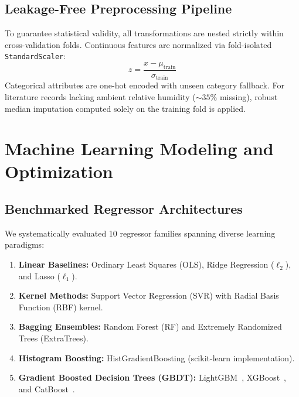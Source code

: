 \documentclass[10pt,twocolumn,a4paper]{article}
\begin{document}
\subsection{Leakage-Free Preprocessing Pipeline}
To guarantee statistical validity, all transformations are nested strictly within cross-validation folds. Continuous features are normalized via fold-isolated \texttt{StandardScaler}:
\begin{equation}
    z = \frac{x - \mu_{\text{train}}}{\sigma_{\text{train}}}
\end{equation}
Categorical attributes are one-hot encoded with unseen category fallback. For literature records lacking ambient relative humidity ($\sim 35\%$ missing), robust median imputation computed solely on the training fold is applied.

\section{Machine Learning Modeling and Optimization}
\label{sec:modeling}

\subsection{Benchmarked Regressor Architectures}
We systematically evaluated 10 regressor families spanning diverse learning paradigms:
\begin{enumerate}
    \item \textbf{Linear Baselines:} Ordinary Least Squares (OLS), Ridge Regression ($\ell_2$), and Lasso ($\ell_1$).
    \item \textbf{Kernel Methods:} Support Vector Regression (SVR) with Radial Basis Function (RBF) kernel.
    \item \textbf{Bagging Ensembles:} Random Forest (RF) and Extremely Randomized Trees (ExtraTrees).
    \item \textbf{Histogram Boosting:} HistGradientBoosting (scikit-learn implementation).
    \item \textbf{Gradient Boosted Decision Trees (GBDT):} LightGBM~\cite{akiba2019optuna}, XGBoost~\cite{chen2016xgboost}, and CatBoost~\cite{prokhorenkova2018catboost}.
\end{enumerate}
\end{document}
